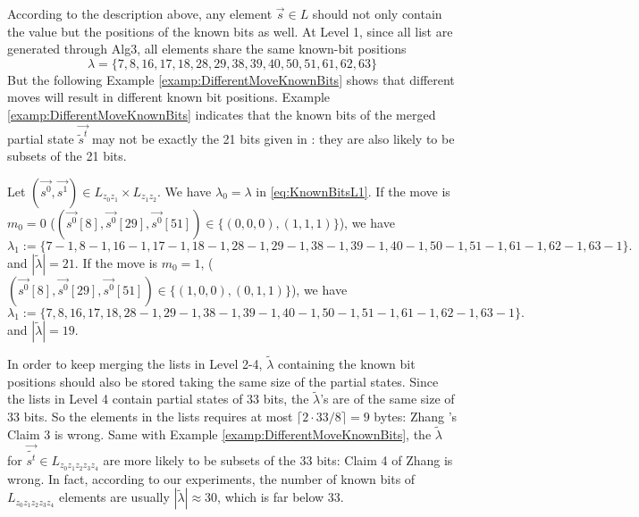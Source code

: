 According to the description above, any element $\vec{s}\in L$ should not only contain the value but the  positions of the known bits as well.
At Level 1, since all list are generated through Alg3, all elements share the same known-bit positions
\begin{equation}\label{eq:KnownBitsL1}
\lambda=\{7,8,16,17,18,  28,29,38,39,40,  50,51,61,62,63\}
\end{equation}
But the following Example \ref{examp:DifferentMoveKnownBits} shows that different moves will result in different known bit positions. 
Example \ref{examp:DifferentMoveKnownBits} indicates that the known bits of the merged partial state $\vec{\tilde{s}^t}$ may not be exactly the 21 bits given in \cite{AC:Zhang19}: they are also likely to be subsets of the 21 bits.
\begin{example}\label{examp:DifferentMoveKnownBits}
  Let $(\vec{s^0},\vec{s^1})\in L_{z_0z_1}\times L_{z_1z_2}$.
  We have $\lambda_0=\lambda$ in \eqref{eq:KnownBitsL1}.
  If the move is $m_0=0$ ($(\vec{s^0}[8], \vec{s^0}[29], \vec{s^0}[51])\in \{(0,0,0),(1,1,1)\}$), we have
  \[
  \lambda_1:=\{7-1,8-1,16-1,17-1,18-1,   28-1,29-1,38-1,39-1,40-1,  50-1,51-1,61-1,62-1,63-1  \}.
  \]
  and $|\tilde{\lambda}|=21$. 
  If the move is $m_0=1$, ($(\vec{s^0}[8], \vec{s^0}[29], \vec{s^0}[51])\in \{(1,0,0),(0,1,1)\}$), we have
  \[
  \lambda_1:=\{7,8,16,17,18,   28-1,29-1,38-1,39-1,40-1,  50-1,51-1,61-1,62-1,63-1  \}.
  \]
    and $|\tilde{\lambda}|=19$.
\end{example}
In order to keep merging the lists in Level 2-4, $\tilde{\lambda}$ containing the known bit positions should also be stored taking the same size of the partial states.
Since the lists in Level 4 contain partial states of 33 bits, the $\tilde{\lambda}$'s are of the same size of 33 bits.
So the elements in the lists requires at most $\lceil 2\cdot 33/8\rceil=9$ bytes: Zhang \etal's Claim 3 is wrong.
Same with Example \ref{examp:DifferentMoveKnownBits}, the $\tilde{\lambda}$ for $\vec{\tilde{s^t}}\in L_{z_0z_1z_2z_3z_4}$ are more likely to be subsets of the 33 bits: Claim 4 of Zhang \etal is wrong.
In fact, according to our experiments, the number of known bits of $L_{z_0z_1z_2z_3z_4}$ elements are usually $|\tilde{\lambda}|\approx 30$, which is far below 33.

